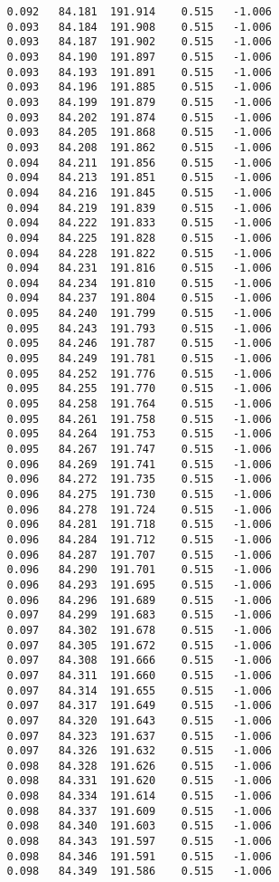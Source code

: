 \begin{verbatim}
   0.092   84.181  191.914    0.515   -1.006
   0.093   84.184  191.908    0.515   -1.006
   0.093   84.187  191.902    0.515   -1.006
   0.093   84.190  191.897    0.515   -1.006
   0.093   84.193  191.891    0.515   -1.006
   0.093   84.196  191.885    0.515   -1.006
   0.093   84.199  191.879    0.515   -1.006
   0.093   84.202  191.874    0.515   -1.006
   0.093   84.205  191.868    0.515   -1.006
   0.093   84.208  191.862    0.515   -1.006
   0.094   84.211  191.856    0.515   -1.006
   0.094   84.213  191.851    0.515   -1.006
   0.094   84.216  191.845    0.515   -1.006
   0.094   84.219  191.839    0.515   -1.006
   0.094   84.222  191.833    0.515   -1.006
   0.094   84.225  191.828    0.515   -1.006
   0.094   84.228  191.822    0.515   -1.006
   0.094   84.231  191.816    0.515   -1.006
   0.094   84.234  191.810    0.515   -1.006
   0.094   84.237  191.804    0.515   -1.006
   0.095   84.240  191.799    0.515   -1.006
   0.095   84.243  191.793    0.515   -1.006
   0.095   84.246  191.787    0.515   -1.006
   0.095   84.249  191.781    0.515   -1.006
   0.095   84.252  191.776    0.515   -1.006
   0.095   84.255  191.770    0.515   -1.006
   0.095   84.258  191.764    0.515   -1.006
   0.095   84.261  191.758    0.515   -1.006
   0.095   84.264  191.753    0.515   -1.006
   0.095   84.267  191.747    0.515   -1.006
   0.096   84.269  191.741    0.515   -1.006
   0.096   84.272  191.735    0.515   -1.006
   0.096   84.275  191.730    0.515   -1.006
   0.096   84.278  191.724    0.515   -1.006
   0.096   84.281  191.718    0.515   -1.006
   0.096   84.284  191.712    0.515   -1.006
   0.096   84.287  191.707    0.515   -1.006
   0.096   84.290  191.701    0.515   -1.006
   0.096   84.293  191.695    0.515   -1.006
   0.096   84.296  191.689    0.515   -1.006
   0.097   84.299  191.683    0.515   -1.006
   0.097   84.302  191.678    0.515   -1.006
   0.097   84.305  191.672    0.515   -1.006
   0.097   84.308  191.666    0.515   -1.006
   0.097   84.311  191.660    0.515   -1.006
   0.097   84.314  191.655    0.515   -1.006
   0.097   84.317  191.649    0.515   -1.006
   0.097   84.320  191.643    0.515   -1.006
   0.097   84.323  191.637    0.515   -1.006
   0.097   84.326  191.632    0.515   -1.006
   0.098   84.328  191.626    0.515   -1.006
   0.098   84.331  191.620    0.515   -1.006
   0.098   84.334  191.614    0.515   -1.006
   0.098   84.337  191.609    0.515   -1.006
   0.098   84.340  191.603    0.515   -1.006
   0.098   84.343  191.597    0.515   -1.006
   0.098   84.346  191.591    0.515   -1.006
   0.098   84.349  191.586    0.515   -1.006

\end{verbatim}
